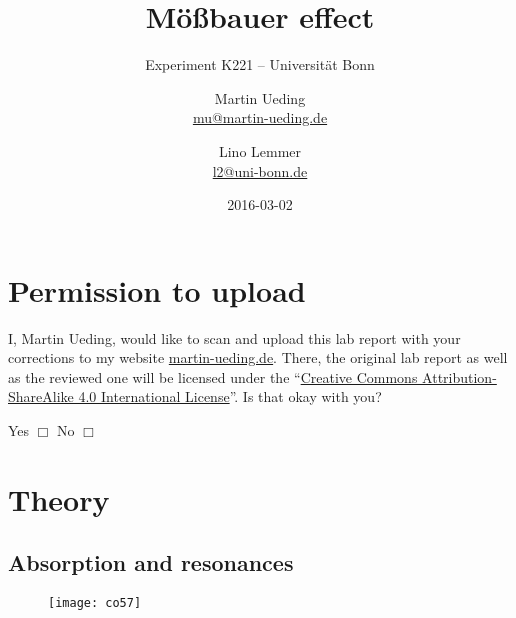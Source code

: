 \documentclass[11pt, english, fleqn, DIV=15, headinclude, BCOR=2cm]{scrreprt}
\title{Mößbauer effect}
\subtitle{Experiment K221 -- Universität Bonn}
\author{%
    Martin Ueding \\
    \small{\href{mailto:mu@martin-ueding.de}{mu@martin-ueding.de}}
    \and
    Lino Lemmer \\
    \small{\href{mailto:l2@uni-bonn.de}{l2@uni-bonn.de}}
}
\date{2016-03-02}
\begin{document}
\maketitle

\chapter*{Permission to upload}

I, Martin Ueding, would like to scan and upload this lab report with your
corrections to my website \href{http://martin-ueding.de}{martin-ueding.de}.
There, the original lab report as well as the reviewed one will be licensed
under the “\href{http://creativecommons.org/licenses/by-sa/4.0/}{Creative
Commons Attribution-ShareAlike 4.0 International License}”. Is that okay with
you?

Yes $\Box$ \hspace{2cm} No $\Box$

\begin{abstract}
\end{abstract}

\tableofcontents

\chapter{Theory}

\section{Absorption and resonances}

\begin{figure}
    \centering
    \texttt{[image: co57]}
    \caption{%
    }
    \label{fig:co57}
\end{figure}
\end{document}
